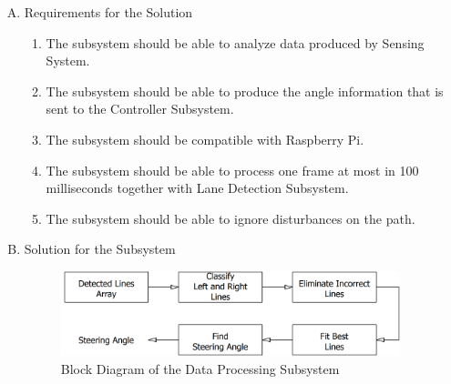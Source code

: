 \documentclass[a4paper,12pt]{article}
\begin{document}
\begin{enumerate}[A.]

\item {Requirements for the Solution}


\begin{enumerate}[1)]

\item The subsystem should be able to analyze data produced by Sensing System.

\item The subsystem should be able to produce the angle information that is sent to the Controller Subsystem.

\item The subsystem should be compatible with Raspberry Pi.

\item The subsystem should be able to process one frame at most in 100 milliseconds together with Lane Detection Subsystem.

\item The subsystem should be able to ignore disturbances on the path.

\end{enumerate}


\item {Solution for the Subsystem}

\begin{figure}[h]

\includegraphics[width=0.93\textwidth,center]{images/vModels/dataProcessing_subsystem}

\caption{Block Diagram of the Data Processing Subsystem}\label{fig:dataProcessing_subsystem}

\end{figure}




\end{enumerate}
\end{document}
